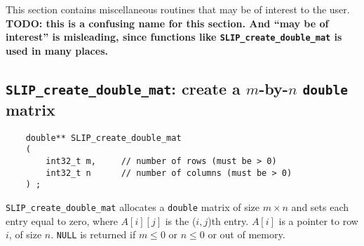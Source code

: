 \documentclass[12pt]{article}
\theoremstyle{definition}
\begin{document}
This section contains miscellaneous routines that may be of interest to the
user.
{\bf TODO: this is a confusing name for this section.  And ``may be of
interest'' is misleading, since functions like \verb|SLIP_create_double_mat| is
used in many places.}

\cprotect\subsection{\verb|SLIP_create_double_mat|: create a $m$-by-$n$ \verb|double| matrix} \label{ss:create_double_mat}

\begin{mdframed}[userdefinedwidth=6in]
{\footnotesize
\begin{verbatim}
    double** SLIP_create_double_mat
    (
        int32_t m,     // number of rows (must be > 0)
        int32_t n      // number of columns (must be > 0)
    ) ;
\end{verbatim}
} \end{mdframed}

\verb|SLIP_create_double_mat| allocates a \verb|double| matrix of size $m
\times n$ and sets each entry equal to zero, where $A[i][j]$ is the ($i,j$)th
entry. $A[i]$ is a pointer to row $i$, of size $n$. \verb|NULL| is returned if
$m \le 0 $ or $n\le 0$ or out of memory.



\end{document}
